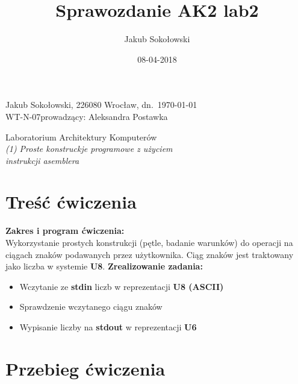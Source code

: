 \documentclass[11pt]{report}
\title{Sprawozdanie AK2 lab2}
\date{08-04-2018}
\author{Jakub Sokołowski}
\newcommand{\LabNum}{1}
\begin{document}
\noindent
  Jakub Sokołowski, 226080
  \hfill Wrocław, dn.\ {\AdvanceDate[-1]\today}\\
\hfill
\noindent
WT-N-07\hfill  prowadzący: Aleksandra Postawka\\
\vspace{1cm}
\begin{center}
  \begin{Large}
  	Laboratorium Architektury Komputerów\\
    \emph{(\LabNum) Proste konstruckje programowe z użyciem\\
    instrukcji asemblera}
  \end{Large}
\end{center}


\section{Treść ćwiczenia}
\label{sec:tresc-cwiczenia}
\textbf{Zakres i program ćwiczenia:}\\
Wykorzystanie prostych konstrukcji (pętle, badanie warunków) do operacji na ciągach znaków podawanych przez użytkownika. Ciąg znaków jest traktowany jako liczba w systemie \textbf{U8}.
\textbf{Zrealizowanie zadania:}
\begin{itemize}[leftmargin=*]
	\item Wczytanie ze \textbf{stdin} liczb w reprezentacji \textbf{ U8 (ASCII)}
	\item Sprawdzenie wczytanego ciągu znaków
	\item Wypisanie liczby na \textbf{stdout} w reprezentacji \textbf{U6}
\end{itemize}
\section{Przebieg ćwiczenia}
\label{sec:przebieg-cwiczenia}
\end{document}
